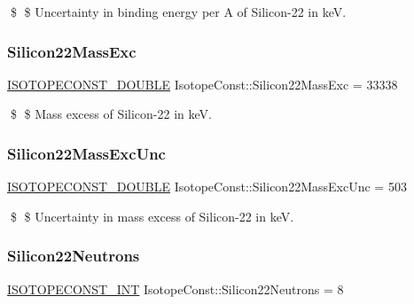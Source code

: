 \$ \$ Uncertainty in binding energy per A of Silicon-\/22 in keV. \mbox{\label{group___isotope_const-_silicon-_si22_ga5eb8937f91feec5c7376106b06a59e9b}} 
\subsubsection{\texorpdfstring{Silicon22\+Mass\+Exc}{Silicon22MassExc}}
{\footnotesize\ttfamily \mbox{\hyperlink{group___isotope_const-_macros_ga8f45a7272ce02c0b4c65c44636ed719a}{I\+S\+O\+T\+O\+P\+E\+C\+O\+N\+S\+T\+\_\+\+D\+O\+U\+B\+LE}} Isotope\+Const\+::\+Silicon22\+Mass\+Exc = 33338}

\$ \$ Mass excess of Silicon-\/22 in keV. \mbox{\label{group___isotope_const-_silicon-_si22_gaa7374a35761c33df503bb9edab10ab54}} 
\subsubsection{\texorpdfstring{Silicon22\+Mass\+Exc\+Unc}{Silicon22MassExcUnc}}
{\footnotesize\ttfamily \mbox{\hyperlink{group___isotope_const-_macros_ga8f45a7272ce02c0b4c65c44636ed719a}{I\+S\+O\+T\+O\+P\+E\+C\+O\+N\+S\+T\+\_\+\+D\+O\+U\+B\+LE}} Isotope\+Const\+::\+Silicon22\+Mass\+Exc\+Unc = 503}

\$ \$ Uncertainty in mass excess of Silicon-\/22 in keV. \mbox{\label{group___isotope_const-_silicon-_si22_gaa5f3ca4a5874748d75676cd6104314e5}} 
\subsubsection{\texorpdfstring{Silicon22\+Neutrons}{Silicon22Neutrons}}
{\footnotesize\ttfamily \mbox{\hyperlink{group___isotope_const-_macros_ga5f18360b3e99483a35c32d789e62621c}{I\+S\+O\+T\+O\+P\+E\+C\+O\+N\+S\+T\+\_\+\+I\+NT}} Isotope\+Const\+::\+Silicon22\+Neutrons = 8}

